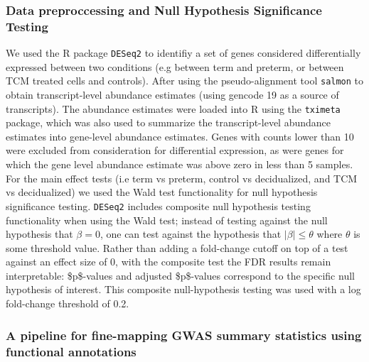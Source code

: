 \subsubsection{Data preproccessing and Null Hypothesis Significance Testing}\label{sec:org653e6dd}

We used the R package \texttt{DESeq2}\cite{DESeq2} to identifiy a set of genes considered differentially expressed between two conditions (e.g between term and preterm, or between TCM treated cells and controls).
After using the pseudo-alignment tool \texttt{salmon}\cite{salmon} to obtain transcript-level abundance estimates (using gencode 19 as a source of transcripts).  The abundance estimates were loaded into R 
using the \texttt{tximeta} package,\cite{tximeta} which was also used to summarize the transcript-level abundance estimates into gene-level abundance estimates.  Genes with counts lower than 10 were excluded from consideration
for differential expression, as were genes for which the gene level abundance estimate was above zero in less than 5 samples.  For the main effect tests (i.e term vs preterm, control vs decidualized, and TCM vs decidualized) 
 we used the Wald test functionality for null hypothesis significance testing.  \texttt{DESeq2} includes composite null hypothesis testing functionality when using the Wald test; instead of testing against the null hypothesis 
 that \(\beta =  0\), one can test against the hypothesis that \(\lvert \beta \rvert \leq \theta\) where \(\theta\) is some threshold value.  Rather than adding a fold-change cutoff on top of a test against an effect size of 0,
 with the composite test the FDR results remain interpretable: \$p\$-values and adjusted \$p\$-values correspond to the specific null hypothesis of interest.  This composite null-hypothesis testing was used with a log fold-change threshold of 0.2.



\subsubsection{A pipeline for fine-mapping GWAS summary statistics using functional annotations}\label{sec:org24e3fbe}



